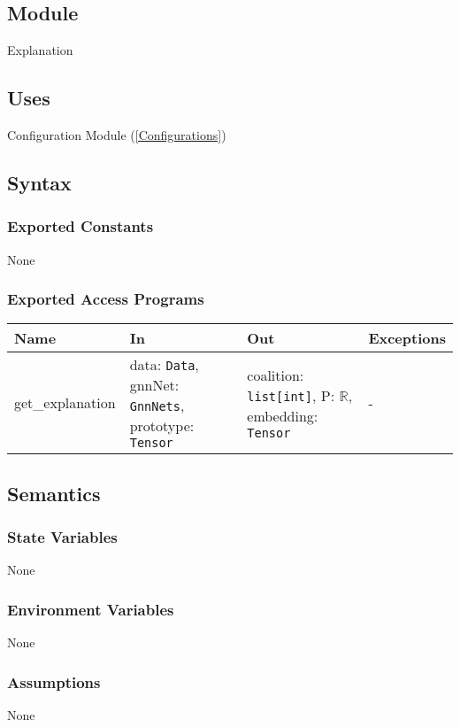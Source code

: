 \documentclass[12pt, titlepage]{article}
\begin{document}
\subsection{Module}
Explanation

\subsection{Uses}
Configuration Module (\ref{Configurations})

\subsection{Syntax}

\subsubsection{Exported Constants}
None

\subsubsection{Exported Access Programs}

\begin{center}
\begin{tabular}{p{3cm} p{5cm} p{4.5cm} p{3cm}}
\hline
\textbf{Name} & \textbf{In} & \textbf{Out} & \textbf{Exceptions} \\
\hline
get\_explanation & data: \texttt{Data}, gnnNet: \texttt{GnnNets}, prototype: \texttt{Tensor} & coalition: \texttt{list[int]}, P: \(\mathbb{R}\), embedding: \texttt{Tensor} & - \\
\hline
\end{tabular}
\end{center}

\subsection{Semantics}

\subsubsection{State Variables}
None

\subsubsection{Environment Variables}
None

\subsubsection{Assumptions}
None
\end{document}
